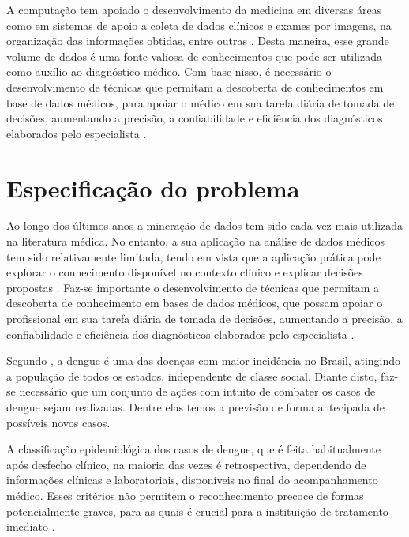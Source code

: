 \documentclass[
	12pt,				%
	openright,			%
	oneside,	
	a4paper,				%
	english,				%
	brazil				%
]{abntex2/abntex2} %
\begin{document}
	A computação tem apoiado o desenvolvimento da medicina em diversas áreas como em sistemas de apoio a coleta de dados clínicos e exames por imagens, na organização das informações obtidas, entre outras \cite{costa:2012}. Desta maneira, esse grande volume de dados é uma fonte valiosa de conhecimentos que pode ser utilizada como auxílio ao diagnóstico médico. Com base nisso, é necessário o desenvolvimento de técnicas que permitam a descoberta de conhecimentos em base de dados médicos, para apoiar o médico em sua tarefa diária de tomada de decisões, aumentando a precisão, a confiabilidade e eficiência dos diagnósticos elaborados pelo especialista \cite{costa:2012}.
    
    \newpage
	\section{Especificação do problema}
		
		Ao longo dos últimos anos a mineração de dados tem sido cada vez mais utilizada na literatura médica. No entanto, a sua aplicação na análise de dados médicos tem sido relativamente limitada, tendo em vista que a aplicação prática pode explorar o conhecimento disponível no contexto clínico e explicar decisões propostas \cite{bellazzi:2008}. Faz-se importante o desenvolvimento de técnicas que permitam a descoberta de conhecimento em bases de dados médicos, que possam apoiar o profissional em sua tarefa diária de tomada de decisões, aumentando a precisão, a confiabilidade e eficiência dos diagnósticos elaborados pelo especialista \cite{costa:2012}.
		
		Segundo \cite{saude:2013}, a dengue é uma das doenças com maior incidência no Brasil, atingindo a população de todos os estados, independente de classe social. Diante disto, faz-se necessário que um conjunto de ações com intuito de combater os casos de dengue sejam realizadas. Dentre elas temos a previsão de forma antecipada de possíveis novos casos.

		A classificação epidemiológica dos casos de dengue, que é feita habitualmente após desfecho clínico, na maioria das vezes é retrospectiva, dependendo de informações clínicas e laboratoriais, disponíveis no final do acompanhamento médico. Esses critérios não permitem o reconhecimento precoce de formas potencialmente graves, para as quais é crucial para a instituição de tratamento imediato \cite{saude:2013}.
\end{document}
